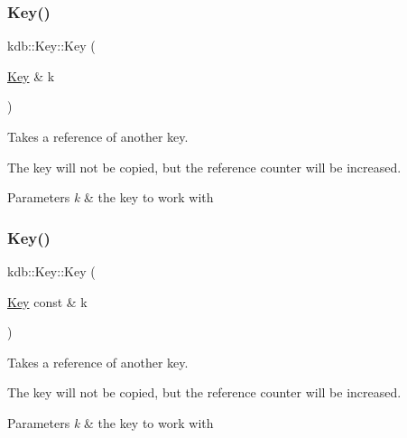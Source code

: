 \subsubsection{\texorpdfstring{Key()}{Key()}\hspace{0.1cm}{\footnotesize\ttfamily [3/7]}}
{\footnotesize\ttfamily kdb\+::\+Key\+::\+Key (\begin{DoxyParamCaption}\item[{\mbox{\hyperlink{classkdb_1_1Key}{Key}} \&}]{k }\end{DoxyParamCaption})\hspace{0.3cm}{\ttfamily [inline]}}



Takes a reference of another key. 

The key will not be copied, but the reference counter will be increased.


\begin{DoxyParams}{Parameters}
{\em k} & the key to work with \\
\hline
\end{DoxyParams}
\mbox{\label{classkdb_1_1Key_ab68da8be743b2f635ff8e28dfaeaaea6}} 
\subsubsection{\texorpdfstring{Key()}{Key()}\hspace{0.1cm}{\footnotesize\ttfamily [4/7]}}
{\footnotesize\ttfamily kdb\+::\+Key\+::\+Key (\begin{DoxyParamCaption}\item[{\mbox{\hyperlink{classkdb_1_1Key}{Key}} const \&}]{k }\end{DoxyParamCaption})\hspace{0.3cm}{\ttfamily [inline]}}



Takes a reference of another key. 

The key will not be copied, but the reference counter will be increased.


\begin{DoxyParams}{Parameters}
{\em k} & the key to work with \\
\hline
\end{DoxyParams}
\mbox{\label{classkdb_1_1Key_a15b2e9e1cc323cde05b0d1d3805656e0}} 
